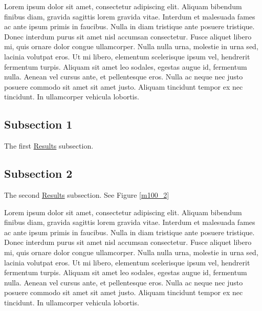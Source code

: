 \documentclass[10pt,]{article}
\begin{document}
Lorem ipsum dolor sit amet, consectetur adipiscing elit. Aliquam bibendum finibus diam, gravida sagittis lorem gravida vitae. Interdum et malesuada fames ac ante ipsum primis in faucibus. Nulla in diam tristique ante posuere tristique. Donec interdum purus sit amet nisl accumsan consectetur. Fusce aliquet libero mi, quis ornare dolor congue ullamcorper. Nulla nulla urna, molestie in urna sed, lacinia volutpat eros. Ut mi libero, elementum scelerisque ipsum vel, hendrerit fermentum turpis. Aliquam sit amet leo sodales, egestas augue id, fermentum nulla. Aenean vel cursus ante, et pellentesque eros. Nulla ac neque nec justo posuere commodo sit amet sit amet justo. Aliquam tincidunt tempor ex nec tincidunt. In ullamcorper vehicula lobortis.

\hypertarget{subsection-1-1}{%
\subsection{Subsection 1}\label{subsection-1-1}}

The first \protect\hyperlink{results}{Results} subsection.

\hypertarget{subsection-2-1}{%
\subsection{Subsection 2}\label{subsection-2-1}}

The second \protect\hyperlink{results}{Results} subsection. See Figure \ref{m100_2}

Lorem ipsum dolor sit amet, consectetur adipiscing elit. Aliquam bibendum finibus diam, gravida sagittis lorem gravida vitae. Interdum et malesuada fames ac ante ipsum primis in faucibus. Nulla in diam tristique ante posuere tristique. Donec interdum purus sit amet nisl accumsan consectetur. Fusce aliquet libero mi, quis ornare dolor congue ullamcorper. Nulla nulla urna, molestie in urna sed, lacinia volutpat eros. Ut mi libero, elementum scelerisque ipsum vel, hendrerit fermentum turpis. Aliquam sit amet leo sodales, egestas augue id, fermentum nulla. Aenean vel cursus ante, et pellentesque eros. Nulla ac neque nec justo posuere commodo sit amet sit amet justo. Aliquam tincidunt tempor ex nec tincidunt. In ullamcorper vehicula lobortis.
\end{document}
